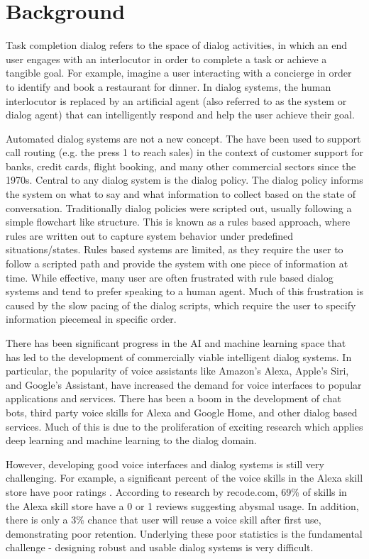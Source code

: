 \section{Background}

Task completion dialog refers to the space of dialog activities, in which an end user engages with an interlocutor in order to complete a task or achieve a tangible goal. For example, imagine a user interacting with a concierge in order to identify and book a restaurant for dinner. In dialog systems, the human interlocutor is replaced by an artificial agent (also referred to as the system or dialog agent) that can intelligently respond and help the user achieve their goal.

Automated dialog systems are not a new concept. The have been used to support call routing (e.g. the press 1 to reach sales) in the context of customer support for banks, credit cards, flight booking, and many other commercial sectors since the 1970s. Central to any dialog system is the dialog policy. The dialog policy informs the system on what to say and what information to collect based on the state of conversation. Traditionally dialog policies were scripted out, usually following a simple flowchart like structure. This is known as a rules based approach, where rules are written out to capture system behavior under predefined situations/states. Rules based systems are limited, as they require the user to follow a scripted path and provide the system with one piece of information at time. While effective, many user are often frustrated with rule based dialog systems and tend to prefer speaking to a human agent. Much of this frustration is caused by the slow pacing of the dialog scripts, which require the user to specify information piecemeal in specific order. 

There has been significant progress in the AI and machine learning space that has led to the development of commercially viable intelligent dialog systems. In particular, the popularity of voice assistants like Amazon’s Alexa, Apple’s Siri, and Google's Assistant, have increased the demand for voice interfaces to popular applications and services. There has been a boom in the development of chat bots, third party voice skills for Alexa and Google Home, and other dialog based services. Much of this is due to the proliferation of exciting research which applies deep learning and machine learning to the dialog domain. 

However, developing good voice interfaces and dialog systems is still very challenging. For example, a significant percent of the voice skills in the Alexa skill store have poor ratings \cite{rey_2017}. According to research by recode.com, 69\% of skills in the Alexa skill store have a 0 or 1 reviews suggesting abysmal usage. In addition, there is only a 3\% chance that user will reuse a voice skill after first use, demonstrating poor retention. Underlying these poor statistics is the fundamental challenge - designing robust and usable dialog systems is very difficult. 
 
